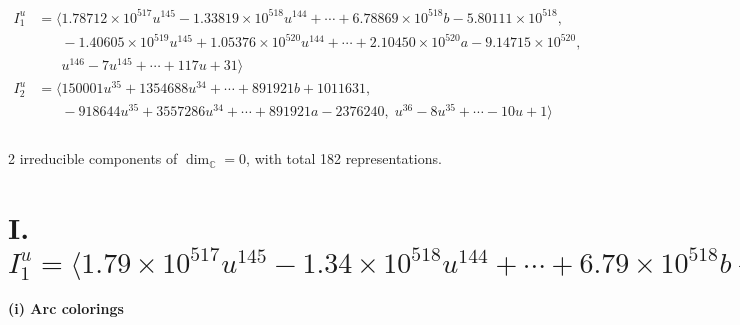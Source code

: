 \documentclass[1p]{elsarticle_modified}
\theoremstyle{definition}
\begin{document}
\begin{align*}
I^u_{1}&=\langle 
1.78712\times10^{517} u^{145}-1.33819\times10^{518} u^{144}+\cdots+6.78869\times10^{518} b-5.80111\times10^{518},\\
\phantom{I^u_{1}}&\phantom{= \langle  }-1.40605\times10^{519} u^{145}+1.05376\times10^{520} u^{144}+\cdots+2.10450\times10^{520} a-9.14715\times10^{520},\\
\phantom{I^u_{1}}&\phantom{= \langle  }u^{146}-7 u^{145}+\cdots+117 u+31\rangle \\
I^u_{2}&=\langle 
150001 u^{35}+1354688 u^{34}+\cdots+891921 b+1011631,\\
\phantom{I^u_{2}}&\phantom{= \langle  }-918644 u^{35}+3557286 u^{34}+\cdots+891921 a-2376240,\;u^{36}-8 u^{35}+\cdots-10 u+1\rangle \\
\\
\end{align*}
\raggedright * 2 irreducible components of $\dim_{\mathbb{C}}=0$, with total 182 representations.\\
\newpage
\renewcommand{\arraystretch}{1}
\centering \section*{I. $I^u_{1}= \langle 1.79\times10^{517} u^{145}-1.34\times10^{518} u^{144}+\cdots+6.79\times10^{518} b-5.80\times10^{518},\;-1.41\times10^{519} u^{145}+1.05\times10^{520} u^{144}+\cdots+2.10\times10^{520} a-9.15\times10^{520},\;u^{146}-7 u^{145}+\cdots+117 u+31 \rangle$}
\flushleft \textbf{(i) Arc colorings}\\
\end{document}
